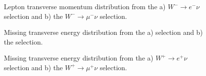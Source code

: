 \begin{figure}[h]
\begin{minipage}[h]{0.49\linewidth}
\end{minipage}
\hfill
\begin{minipage}[h]{0.49\linewidth}
\end{minipage}
\label{ris:WlnuMLepPt}
\caption{Lepton transverse momentum distribution from the a) $W^{-} \to e^{-} \nu$ selection and  b) the $W^{-} \to \mu^{-} \nu$ selection.}
\end{figure}




\begin{figure}[h]
\begin{minipage}[h]{0.49\linewidth}
\end{minipage}
\hfill
\begin{minipage}[h]{0.49\linewidth}
\end{minipage}

\caption{Missing transverse energy distribution from the a) \wenu selection and  b) the \wmunu selection.}
\end{figure}

\begin{figure}[h]
\begin{minipage}[h]{0.49\linewidth}
\end{minipage}
\hfill
\begin{minipage}[h]{0.49\linewidth}
\end{minipage}

\caption{Missing transverse energy distribution from the a) $W^{+} \to e^{+} \nu$ selection and  b) the $W^{+} \to \mu^{+} \nu$ selection.}
\end{figure}

